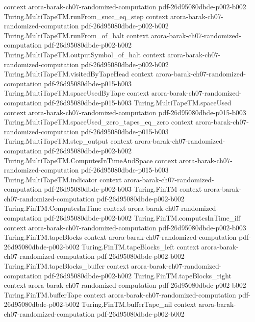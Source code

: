 \begin{theorem}
  {context}
  {arora-barak-ch07-randomized-computation}
  {pdf-26d95080dbde-p002-b002}
\proofstep
  {Turing.MultiTapeTM.runFrom_succ_eq_step}
  {context}
  {arora-barak-ch07-randomized-computation}
  {pdf-26d95080dbde-p002-b002}
\proofstep
  {Turing.MultiTapeTM.runFrom_of_halt}
  {context}
  {arora-barak-ch07-randomized-computation}
  {pdf-26d95080dbde-p002-b002}
\proofstep
  {Turing.MultiTapeTM.outputSymbol_of_halt}
  {context}
  {arora-barak-ch07-randomized-computation}
  {pdf-26d95080dbde-p002-b002}
\proofstep
  {Turing.MultiTapeTM.visitedByTapeHead}
  {context}
  {arora-barak-ch07-randomized-computation}
  {pdf-26d95080dbde-p015-b003}
\proofstep
  {Turing.MultiTapeTM.spaceUsedByTape}
  {context}
  {arora-barak-ch07-randomized-computation}
  {pdf-26d95080dbde-p015-b003}
\proofstep
  {Turing.MultiTapeTM.spaceUsed}
  {context}
  {arora-barak-ch07-randomized-computation}
  {pdf-26d95080dbde-p015-b003}
\proofstep
  {Turing.MultiTapeTM.spaceUsed_zero_tapes_eq_zero}
  {context}
  {arora-barak-ch07-randomized-computation}
  {pdf-26d95080dbde-p015-b003}
\proofstep
  {Turing.MultiTapeTM.step_output}
  {context}
  {arora-barak-ch07-randomized-computation}
  {pdf-26d95080dbde-p002-b002}
\proofstep
  {Turing.MultiTapeTM.ComputesInTimeAndSpace}
  {context}
  {arora-barak-ch07-randomized-computation}
  {pdf-26d95080dbde-p015-b003}
\proofstep
  {Turing.MultiTapeTM.indicator}
  {context}
  {arora-barak-ch07-randomized-computation}
  {pdf-26d95080dbde-p002-b003}
\proofstep
  {Turing.FinTM}
  {context}
  {arora-barak-ch07-randomized-computation}
  {pdf-26d95080dbde-p002-b002}
\proofstep
  {Turing.FinTM.ComputesInTime}
  {context}
  {arora-barak-ch07-randomized-computation}
  {pdf-26d95080dbde-p002-b002}
\proofstep
  {Turing.FinTM.computesInTime_iff}
  {context}
  {arora-barak-ch07-randomized-computation}
  {pdf-26d95080dbde-p002-b003}
\proofstep
  {Turing.FinTM.tapeBlocks}
  {context}
  {arora-barak-ch07-randomized-computation}
  {pdf-26d95080dbde-p002-b002}
\proofstep
  {Turing.FinTM.tapeBlocks_left}
  {context}
  {arora-barak-ch07-randomized-computation}
  {pdf-26d95080dbde-p002-b002}
\proofstep
  {Turing.FinTM.tapeBlocks_buffer}
  {context}
  {arora-barak-ch07-randomized-computation}
  {pdf-26d95080dbde-p002-b002}
\proofstep
  {Turing.FinTM.tapeBlocks_right}
  {context}
  {arora-barak-ch07-randomized-computation}
  {pdf-26d95080dbde-p002-b002}
\proofstep
  {Turing.FinTM.bufferTape}
  {context}
  {arora-barak-ch07-randomized-computation}
  {pdf-26d95080dbde-p002-b002}
\proofstep
  {Turing.FinTM.bufferTape_nil}
  {context}
  {arora-barak-ch07-randomized-computation}
  {pdf-26d95080dbde-p002-b002}

\end{theorem}
